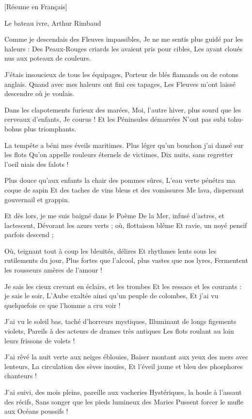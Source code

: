 [Résume en Français]\newline \newline

Le bateau ivre, Arthur Rimbaud 


Comme je descendais des Fleuves impassibles,
Je ne me sentis plus guidé par les haleurs :
Des Peaux-Rouges criards les avaient pris pour cibles,
Les ayant cloués nus aux poteaux de couleurs.

J'étais insoucieux de tous les équipages,
Porteur de blés flamands ou de cotons anglais.
Quand avec mes haleurs ont fini ces tapages,
Les Fleuves m'ont laissé descendre où je voulais.

Dans les clapotements furieux des marées,
Moi, l'autre hiver, plus sourd que les cerveaux d'enfants,
Je courus ! Et les Péninsules démarrées
N'ont pas subi tohu-bohus plus triomphants.

La tempête a béni mes éveils maritimes.
Plus léger qu'un bouchon j'ai dansé sur les flots
Qu'on appelle rouleurs éternels de victimes,
Dix nuits, sans regretter l'oeil niais des falots !

Plus douce qu'aux enfants la chair des pommes sûres,
L'eau verte pénétra ma coque de sapin
Et des taches de vins bleus et des vomissures
Me lava, dispersant gouvernail et grappin.

Et dès lors, je me suis baigné dans le Poème
De la Mer, infusé d'astres, et lactescent,
Dévorant les azurs verts ; où, flottaison blême
Et ravie, un noyé pensif parfois descend ;

Où, teignant tout à coup les bleuités, délires
Et rhythmes lents sous les rutilements du jour,
Plus fortes que l'alcool, plus vastes que nos lyres,
Fermentent les rousseurs amères de l'amour !

Je sais les cieux crevant en éclairs, et les trombes
Et les ressacs et les courants : je sais le soir,
L'Aube exaltée ainsi qu'un peuple de colombes,
Et j'ai vu quelquefois ce que l'homme a cru voir !

J'ai vu le soleil bas, taché d'horreurs mystiques,
Illuminant de longs figements violets,
Pareils à des acteurs de drames très antiques
Les flots roulant au loin leurs frissons de volets !

J'ai rêvé la nuit verte aux neiges éblouies,
Baiser montant aux yeux des mers avec lenteurs,
La circulation des sèves inouïes,
Et l'éveil jaune et bleu des phosphores chanteurs !

J'ai suivi, des mois pleins, pareille aux vacheries
Hystériques, la houle à l'assaut des récifs,
Sans songer que les pieds lumineux des Maries
Pussent forcer le mufle aux Océans poussifs !

